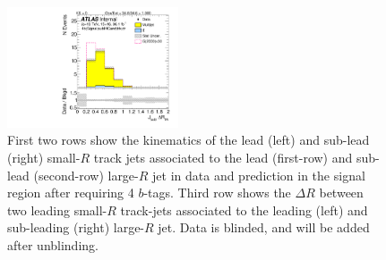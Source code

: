 \begin{figure}[htbp!]
\begin{center}
\includegraphics[width=0.45\textwidth,angle=-90]{figures/boosted/Signal/b77_FourTag_Signal_sublHCand_trk_dr_blind.pdf}
  \caption{First two rows show the kinematics of the lead (left) and sub-lead (right) small-$R$ track jets associated to the lead (first-row) and sub-lead (second-row) large-$R$ jet in data and prediction in the signal region after requiring 4 $b$-tags. Third row shows the $\Delta R$ between two leading small-$R$ track-jets associated to the leading (left) and sub-leading (right) large-$R$ jet. Data is blinded, and will be added after unblinding. }
  \label{fig:boosted-4b-signal-blind-ak2}
\end{center}
\end{figure}


